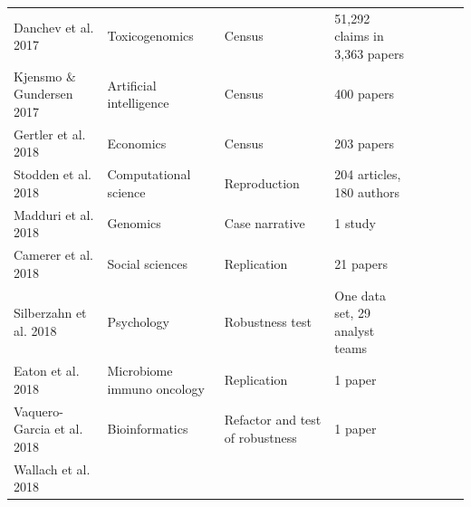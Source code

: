\documentclass{drexelthesis}
\begin{document}
\begin{table}[H]
\begin{adjustbox}{max width=\textwidth}
\begin{tabular}{p{3.86cm}p{4.12cm}p{4.29cm}p{4.24cm}p{3.86cm}p{4.12cm}p{4.29cm}p{4.24cm}}
\multicolumn{1}{p{3.86cm}}{Danchev et al. 2017 \cite{Danchev2018-wf}} & 
\multicolumn{1}{p{4.12cm}}{Toxicogenomics} & 
\multicolumn{1}{p{4.29cm}}{Census} & 
\multicolumn{1}{p{4.24cm}}{51,292 claims in 3,363 papers} \\ 
\multicolumn{1}{p{3.86cm}}{Kjensmo $\&$ Gundersen 2017 \cite{Kjensmo2017-ni}} & 
\multicolumn{1}{p{4.12cm}}{Artificial intelligence} & 
\multicolumn{1}{p{4.29cm}}{Census} & 
\multicolumn{1}{p{4.24cm}}{400 papers} \\ 
\multicolumn{1}{p{3.86cm}}{Gertler et al. 2018 \cite{Gertler2018-uf}} & 
\multicolumn{1}{p{4.12cm}}{Economics} & 
\multicolumn{1}{p{4.29cm}}{Census} & 
\multicolumn{1}{p{4.24cm}}{203 papers} \\ 
\multicolumn{1}{p{3.86cm}}{Stodden et al. 2018 \cite{Stodden2018-oe}} & 
\multicolumn{1}{p{4.12cm}}{Computational science} & 
\multicolumn{1}{p{4.29cm}}{Reproduction} & 
\multicolumn{1}{p{4.24cm}}{204 articles, 180 authors} \\ 
\multicolumn{1}{p{3.86cm}}{Madduri et al. 2018 \cite{Madduri2018-kc}} & 
\multicolumn{1}{p{4.12cm}}{Genomics} & 
\multicolumn{1}{p{4.29cm}}{Case narrative} & 
\multicolumn{1}{p{4.24cm}}{1 study} \\ 
\multicolumn{1}{p{3.86cm}}{Camerer et al. 2018 \cite{Camerer2016-tr}} & 
\multicolumn{1}{p{4.12cm}}{Social sciences} & 
\multicolumn{1}{p{4.29cm}}{Replication} & 
\multicolumn{1}{p{4.24cm}}{21 papers} \\ 
\multicolumn{1}{p{3.86cm}}{Silberzahn et al. 2018 \cite{Silberzahn2015-yx}} & 
\multicolumn{1}{p{4.12cm}}{Psychology} & 
\multicolumn{1}{p{4.29cm}}{Robustness test} & 
\multicolumn{1}{p{4.24cm}}{One data set, 29 analyst teams} \\ 
\multicolumn{1}{p{3.86cm}}{Eaton et al. 2018 \cite{Eaton2018-gj}} & 
\multicolumn{1}{p{4.12cm}}{Microbiome immuno oncology} & 
\multicolumn{1}{p{4.29cm}}{Replication} & 
\multicolumn{1}{p{4.24cm}}{1 paper} \\ 
\multicolumn{1}{p{3.86cm}}{Vaquero-Garcia et al. 2018 \cite{Vaquero-Garcia2018-ax}} & 
\multicolumn{1}{p{4.12cm}}{Bioinformatics} & 
\multicolumn{1}{p{4.29cm}}{Refactor and test of robustness} & 
\multicolumn{1}{p{4.24cm}}{1 paper} \\ 
\multicolumn{1}{p{3.86cm}}{Wallach et al. 2018 \cite{Wallach2018-rk}} & 

\end{tabular}
\end{adjustbox}
\end{table}
\end{document}
